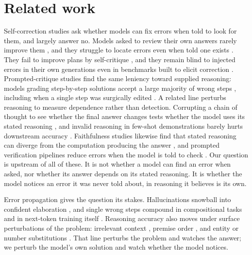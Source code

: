 \section{Related work}
\label{sec:related}

Self-correction studies ask whether models can fix errors when told to look for them, and largely answer no. Models asked to review their own answers rarely improve them \citep{huang2024}, and they struggle to locate errors even when told one exists \citep{tyen2024}. They fail to improve plans by self-critique \citep{valmeekam2023selfcritique,stechly2024selfverification}, and they remain blind to injected errors in their own generations even in benchmarks built to elicit correction \citep{tsui2025}. Prompted-critique studies find the same leniency toward supplied reasoning: models grading step-by-step solutions accept a large majority of wrong steps \citep{reflect2026,vair2026}, including when a single step was surgically edited \citep{breakingchain2026}. A related line perturbs reasoning to measure dependence rather than detection. Corrupting a chain of thought to see whether the final answer changes tests whether the model uses its stated reasoning \citep{lanham2023}, and invalid reasoning in few-shot demonstrations barely hurts downstream accuracy \citep{wang2022,schaeffer2023invalid}. Faithfulness studies likewise find that stated reasoning can diverge from the computation producing the answer \citep{turpin2023unfaithful,arcuschin2025wild,chen2025unfaithful}, and prompted verification pipelines reduce errors when the model is told to check \citep{madaan2023selfrefine,dhuliawala2024cove,ling2023deductive}. Our question is upstream of all of these. It is not whether a model can find an error when asked, nor whether its answer depends on its stated reasoning. It is whether the model notices an error it was never told about, in reasoning it believes is its own.

Error propagation gives the question its stakes. Hallucinations snowball into confident elaboration \citep{zhang2023snowball}, and single wrong steps compound in compositional tasks \citep{dziri2023} and in next-token training itself \citep{bachmann2024pitfalls}. Reasoning accuracy also moves under surface perturbations of the problem: irrelevant context \citep{shi2023distracted}, premise order \citep{chen2024premise}, and entity or number substitutions \citep{mirzadeh2025gsmsymbolic}. That line perturbs the problem and watches the answer; we perturb the model's own solution and watch whether the model notices.

